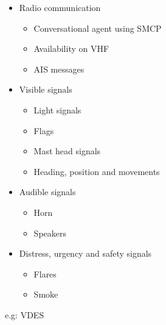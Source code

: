 \begin{itemize}
	\item Radio communication
	\begin{itemize}
		\item Conversational agent using \acf{SMCP}
		\item Availability on \acf{VHF}
		\item \acf{AIS} messages
	\end{itemize}
	\item Visible signals
	\begin{itemize}
		\item Light signals
		\item Flags
		\item Mast head signals
		\item Heading, position and movements
	\end{itemize}
	\item Audible signals
	\begin{itemize}
		\item Horn
		\item Speakers
	\end{itemize}
	\item Distress, urgency and safety signals
	\begin{itemize}
		\item Flares
		\item Smoke
	\end{itemize}
\end{itemize}

e.g: VDES